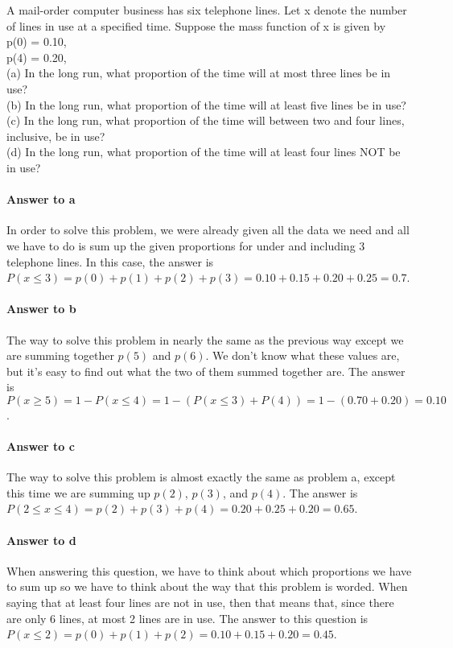 \documentclass{article}
\newcommand{\tab}{\hspace*{3em}} %
\begin{document}
	A mail-order computer business has six telephone lines. Let x denote the number of lines in use 
	at a specified time. Suppose the mass function of x is given by \\
	
	\noindent p(0) = 0.10, \tab{p(1) = 0.15,} \tab{p(2) = 0.20,} \tab{p(3) = 0.25,} \\
	p(4) = 0.20, \tab{p(5) = ????,} \tab{p(6) =????.} \\
	
	\noindent (a) In the long run, what proportion of the time will at most three lines be in use? \\
	(b) In the long run, what proportion of the time will at least five lines be in use? \\
	(c) In the long run, what proportion of the time will between two and four lines, 
	inclusive, be in use? \\
	(d) In the long run, what proportion of the time will at least four lines NOT be in use?
	
	\paragraph{Answer to a}
	In order to solve this problem, we were already given all the data we need and all we have to do 
	is sum up the given proportions for under and including 3 telephone lines. In this case, the 
	answer is $P(x \le 3) = p(0) + p(1) + p(2) + p(3) = 0.10 + 0.15 + 0.20 + 0.25 = 0.7$.
	
	\paragraph{Answer to b}
	The way to solve this problem in nearly the same as the previous way except we are summing 
	together $p(5)$ and $p(6)$. We don't know what these values are, but it's easy to find out what 
	the two of them summed together are. The answer is $P(x \ge 5) = 1 - P(x \le 4) = 1 - (P(x \le 3) 
	+ P(4)) = 1 - (0.70 + 0.20) = 0.10$.
	
	\paragraph{Answer to c}
	The way to solve this problem is almost exactly the same as problem a, except this time we are 
	summing up $p(2)$, $p(3)$, and $p(4)$. The answer is $P(2 \le x \le 4) = p(2) + p(3) + p(4) = 
	0.20 + 0.25 + 0.20 = 0.65$.
	
	\paragraph{Answer to d}
	When answering this question, we have to think about which proportions we have to sum up so 
	we have to think about the way that this problem is worded. When saying that at least four lines 
	are not in use, then that means that, since there are only 6 lines, at most 2 lines are in use. The 
	answer to this question is $P(x \le 2) = p(0) + p(1) + p(2) = 0.10 + 0.15 + 0.20 = 0.45$.
		
\end{document}
